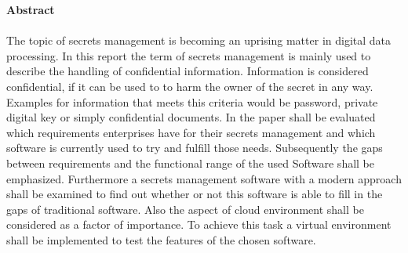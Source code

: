 \documentclass[
book,
a4paper,   
titlepage,  
halfparskip,
12pt        
]{scrartcl}
\begin{document}
\large{\textbf{Abstract}}\\
\\
The topic of secrets management is becoming an uprising matter in digital data processing.
In this report the term of secrets management is mainly used to describe the handling of confidential information.
Information is considered confidential, if it can be used to to harm the owner of the secret in any way.  
Examples for information that meets this criteria would be password, private digital key or simply confidential documents.
In the paper shall be evaluated which requirements enterprises have for their secrets management and which software is currently used to try and fulfill those needs.
Subsequently the gaps between requirements and the functional range of the used Software shall be emphasized.
Furthermore a secrets management software with a modern approach shall be examined to find out whether or not this software is able to fill in the gaps of traditional software.
Also the aspect of cloud environment shall be considered as a factor of importance. 
To achieve this task a virtual environment shall be implemented to test the features of the chosen software.



\pagestyle{fancy}
\fancyhf{} %

\newpage
\tableofcontents
\newpage
\pagestyle{fancy}
\fancyhf{} %
\fancyhead[R]{\thepage} %
\end{document}

